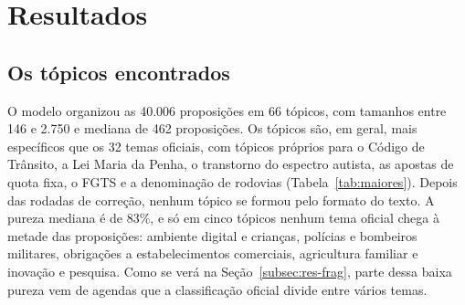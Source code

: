 
\section{Resultados}
\label{sec:resultados}

\subsection{Os tópicos encontrados}
\label{subsec:res-topicos}

O modelo organizou as 40.006 proposições em 66 tópicos, com tamanhos entre 146 e 2.750 e mediana de 462 proposições. Os tópicos são, em geral, mais específicos que os 32 temas oficiais, com tópicos próprios para o Código de Trânsito, a Lei Maria da Penha, o transtorno do espectro autista, as apostas de quota fixa, o FGTS e a denominação de rodovias (Tabela~\ref{tab:maiores}). Depois das rodadas de correção, nenhum tópico se formou pelo formato do texto. A pureza mediana é de 83\%, e só em cinco tópicos nenhum tema oficial chega à metade das proposições: ambiente digital e crianças, polícias e bombeiros militares, obrigações a estabelecimentos comerciais, agricultura familiar e inovação e pesquisa. Como se verá na Seção~\ref{subsec:res-frag}, parte dessa baixa pureza vem de agendas que a classificação oficial divide entre vários temas.

